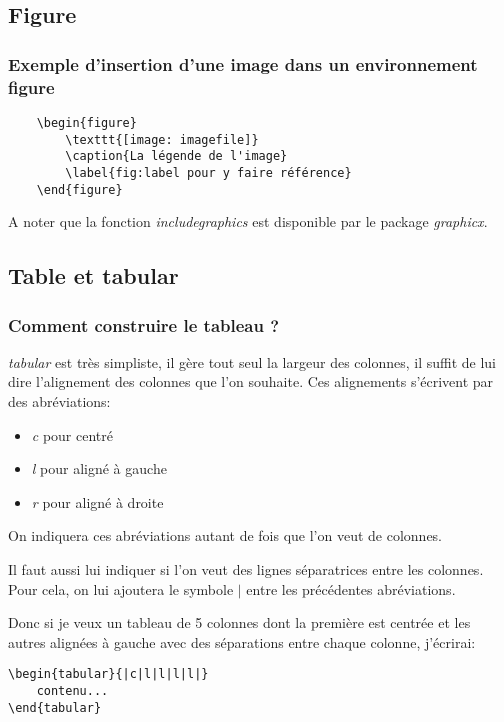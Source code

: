 \documentclass{beamer}
\begin{document}
\subsection{Figure}
\begin{frame}[fragile]
	\frametitle{Exemple d'insertion d'une image dans un environnement figure}
	\begin{Verbatim}
	\begin{figure}
		\texttt{[image: imagefile]}
		\caption{La légende de l'image}
		\label{fig:label pour y faire référence}
	\end{figure}
	\end{Verbatim}
	\vspace{.2cm}
	A noter que la fonction \textit{includegraphics} est disponible par le package \textit{graphicx}.
\end{frame}

\subsection{Table et tabular}
\begin{frame}[fragile]
	\frametitle{Comment construire le tableau ?}
	\textit{tabular} est très simpliste, il gère tout seul la largeur des colonnes, il suffit de lui dire l'alignement des colonnes que l'on souhaite. Ces alignements s'écrivent par des abréviations:
	\begin{itemize}
		\item \textit{c} pour centré
		\item \textit{l} pour aligné à gauche
		\item \textit{r} pour aligné à droite
	\end{itemize}
	On indiquera ces abréviations autant de fois que l'on veut de colonnes.
	
	Il faut aussi lui indiquer si l'on veut des lignes séparatrices entre les colonnes. Pour cela, on lui ajoutera le symbole $\mid$ entre les précédentes abréviations.
\end{frame}

\begin{frame}[fragile]
	Donc si je veux un tableau de 5 colonnes dont la première est centrée et les autres alignées à gauche avec des séparations entre chaque colonne, j'écrirai:
\begin{Verbatim}
\begin{tabular}{|c|l|l|l|l|}
	contenu...
\end{tabular}
\end{Verbatim}
\end{frame}
\end{document}
